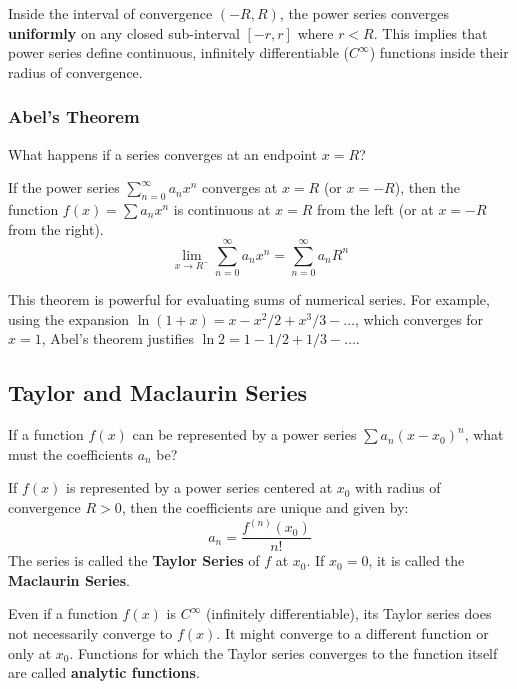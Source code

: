 \begin{property}
Inside the interval of convergence $(-R, R)$, the power series converges \textbf{uniformly} on any closed sub-interval $[-r, r]$ where $r < R$.
This implies that power series define continuous, infinitely differentiable ($C^\infty$) functions inside their radius of convergence.
\end{property}

\subsubsection{Abel's Theorem}
What happens if a series converges at an endpoint $x=R$?

\begin{theorem}
If the power series $\sum_{n=0}^{\infty} a_n x^n$ converges at $x = R$ (or $x = -R$), then the function $f(x) = \sum a_n x^n$ is continuous at $x = R$ from the left (or at $x = -R$ from the right).
\[ \lim_{x \to R^-} \sum_{n=0}^{\infty} a_n x^n = \sum_{n=0}^{\infty} a_n R^n \]
\end{theorem}

This theorem is powerful for evaluating sums of numerical series. For example, using the expansion $\ln(1+x) = x - x^2/2 + x^3/3 - \dots$, which converges for $x=1$, Abel's theorem justifies $\ln 2 = 1 - 1/2 + 1/3 - \dots$.

\subsection{Taylor and Maclaurin Series}

If a function $f(x)$ can be represented by a power series $\sum a_n (x-x_0)^n$, what must the coefficients $a_n$ be?

\begin{theorem}
If $f(x)$ is represented by a power series centered at $x_0$ with radius of convergence $R > 0$, then the coefficients are unique and given by:
\[ a_n = \frac{f^{(n)}(x_0)}{n!} \]
The series is called the \textbf{Taylor Series} of $f$ at $x_0$. If $x_0=0$, it is called the \textbf{Maclaurin Series}.
\end{theorem}

\begin{remark}
Even if a function $f(x)$ is $C^\infty$ (infinitely differentiable), its Taylor series does not necessarily converge to $f(x)$. It might converge to a different function or only at $x_0$.
Functions for which the Taylor series converges to the function itself are called \textbf{analytic functions}.
\end{remark}

